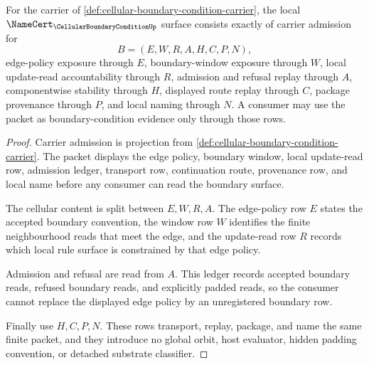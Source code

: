 \begin{theorem}
\label{thm:cellular-boundary-condition-namecert-obligations}
For the carrier of \autoref{def:cellular-boundary-condition-carrier}, the local $\NameCert_{\CellularBoundaryConditionUp}$ surface consists exactly of carrier admission for
$$
B=(E,W,R,A,H,C,P,N),
$$
edge-policy exposure through $E$, boundary-window exposure through $W$, local update-read accountability through $R$, admission and refusal replay through $A$, componentwise stability through $H$, displayed route replay through $C$, package provenance through $P$, and local naming through $N$. A consumer may use the packet as boundary-condition evidence only through those rows.
\end{theorem}
\begin{proof}
Carrier admission is projection from \autoref{def:cellular-boundary-condition-carrier}. The packet displays the edge policy, boundary window, local update-read row, admission ledger, transport row, continuation route, provenance row, and local name before any consumer can read the boundary surface.

The cellular content is split between $E,W,R,A$. The edge-policy row $E$ states the accepted boundary convention, the window row $W$ identifies the finite neighbourhood reads that meet the edge, and the update-read row $R$ records which local rule surface is constrained by that edge policy.

Admission and refusal are read from $A$. This ledger records accepted boundary reads, refused boundary reads, and explicitly padded reads, so the consumer cannot replace the displayed edge policy by an unregistered boundary row.

Finally use $H,C,P,N$. These rows transport, replay, package, and name the same finite packet, and they introduce no global orbit, host evaluator, hidden padding convention, or detached substrate classifier.
\end{proof}

